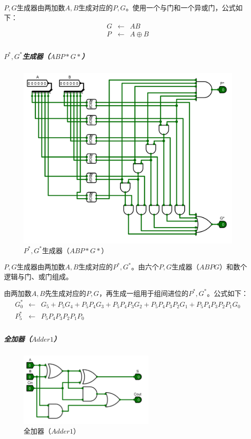 \documentclass[main.tex]{subfiles}
\begin{document}
$P, G$生成器由两加数$A, B$生成对应的$P, G$。使用一个与门和一个异或门，公式如下：
$$
\begin{array}{rcl}
G &\leftarrow& AB \\
P &\leftarrow& A \oplus B \\
\end{array}
$$

\subparagraph{$P^*, G^*$生成器（$ABP*G*$）}

\begin{figure}[H]
\centering
\includegraphics[width=\textwidth]{images/ABGxPx-circuit.png}
\caption{$P^*, G^*$生成器（$ABP*G*$）}
\end{figure}

$P, G$生成器由两加数$A, B$生成对应的$P^*, G^*$。由六个$P, G$生成器（$ABPG$）和数个逻辑与门、或门组成。

由两加数$A, B$先生成对应的$P, G$，再生成一组用于组间进位的$P^*, G^*$。公式如下：
$$
\begin{array}{rcl}
G_0^* &\leftarrow& G_5+P_5G_4+P_5P_4G_3+P_5P_4P_3G_2+P_5P_4P_3P_2G_1+P_5P_4P_3P_2P_1G_0 \\
P_5^* &\leftarrow& P_5P_4P_3P_2P_1P_0 \\
\end{array}
$$

\subparagraph{全加器（$Adder1$）}

\begin{figure}[H]
\centering
\includegraphics[width=0.6\textwidth]{images/Adder1-circuit.png}
\caption{全加器（$Adder1$）}
\end{figure}
\end{document}
